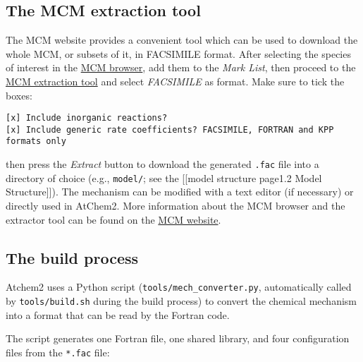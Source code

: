\subsection{The MCM extraction tool}\label{the-mcm-extraction-tool}

The MCM website provides a convenient tool which can be used to download
the whole MCM, or subsets of it, in FACSIMILE format. After selecting
the species of interest in the
\href{http://mcm.leeds.ac.uk/MCMv3.3.1/roots.htt}{MCM browser}, add them
to the \emph{Mark List}, then proceed to the
\href{http://mcm.leeds.ac.uk/MCMv3.3.1/extract.htt}{MCM extraction tool}
and select \emph{FACSIMILE} as format. Make sure to tick the boxes:

\begin{verbatim}
[x] Include inorganic reactions?
[x] Include generic rate coefficients? FACSIMILE, FORTRAN and KPP formats only
\end{verbatim}

then press the \emph{Extract} button to download the generated
\texttt{.fac} file into a directory of choice (e.g., \texttt{model/};
see the {[}{[}model structure page\textbar{}1.2 Model Structure{]}{]}).
The mechanism can be modified with a text editor (if necessary) or
directly used in AtChem2. More information about the MCM browser and the
extractor tool can be found on the \href{http://mcm.leeds.ac.uk}{MCM
website}.

\subsection{The build process}\label{the-build-process}

Atchem2 uses a Python script (\texttt{tools/mech\_converter.py},
automatically called by \texttt{tools/build.sh} during the build
process) to convert the chemical mechanism into a format that can be
read by the Fortran code.

The script generates one Fortran file, one shared library, and four
configuration files from the \texttt{*.fac} file:

